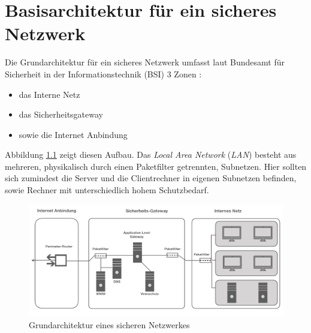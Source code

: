 \chapter{Basisarchitektur für ein sicheres Netzwerk}
\label{K1}
Die Grundarchitektur für ein sicheres Netzwerk umfasst laut Bundesamt für Sicherheit in der Informationstechnik (BSI) 3 Zonen \cite{isi-lana}: 
\begin{itemize}
	\item das Interne Netz 
	\item das Sicherheitsgateway
	\item sowie die Internet Anbindung	
\end{itemize}

Abbildung \ref{grundarch} zeigt diesen Aufbau. Das \emph{Local Area Network} (\emph{LAN}) besteht aus mehreren, physikalisch durch einen Paketfilter getrennten, Subnetzen. Hier sollten sich zumindest die Server und die Clientrechner in eigenen Subnetzen befinden, sowie Rechner mit unterschiedlich hohem Schutzbedarf. 

\begin{figure}[h]
	\includegraphics[width=\linewidth]{grundarchitektur}
	\caption{Grundarchitektur eines sicheren Netzwerkes}
	\label{grundarch}
\end{figure}


